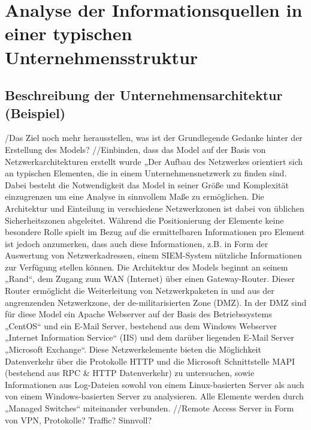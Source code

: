 \chapter{Analyse der Informationsquellen in einer typischen Unternehmensstruktur}
\label{cha:Analyse der Informationsquellen in einer typischen Unternehmensstruktur}


\section{Beschreibung der Unternehmensarchitektur (Beispiel)}




/Das Ziel noch mehr herausstellen, was ist der Grundlegende Gedanke hinter der Erstellung des Models? 
//Einbinden, dass das Model auf der Basis von Netzwerkarchitekturen erstellt wurde
„Der Aufbau des Netzwerkes orientiert sich an typischen Elementen, die in einem Unternehmensnetzwerk zu finden sind. Dabei besteht die Notwendigkeit das Model in seiner Größe und Komplexität einzugrenzen um eine Analyse in sinnvollem Maße zu ermöglichen. Die Architektur und Einteilung in verschiedene Netzwerkzonen ist dabei von üblichen Sicherheitszonen abgeleitet. Während die Positionierung der Elemente keine besondere Rolle spielt im Bezug auf die ermittelbaren Informationen pro Element ist jedoch anzumerken, dass auch diese Informationen, z.B. in Form der Auswertung von Netzwerkadressen, einem SIEM-System nützliche Informationen zur Verfügung stellen können. Die Architektur des Models beginnt an seinem „Rand“, dem Zugang zum WAN (Internet) über einen Gateway-Router. Dieser Router ermöglicht die Weiterleitung von Netzwerkpaketen in und aus der angrenzenden Netzwerkzone, der de-militarisierten Zone (DMZ). In der DMZ sind für diese Model ein Apache Webserver auf der Basis des Betriebssystems „CentOS“ und ein E-Mail Server, bestehend aus dem Windows Webserver „Internet Information Service“ (IIS) und dem darüber liegenden E-Mail Server „Microsoft Exchange“. Diese Netzwerkelemente bieten die Möglichkeit Datenverkehr über die Protokolle HTTP und die Microsoft Schnittstelle MAPI (bestehend aus RPC & HTTP Datenverkehr) zu untersuchen, sowie Informationen aus Log-Dateien sowohl von einem Linux-basierten Server als auch von einem Windows-basierten Server zu analysieren. Alle Elemente werden durch „Managed Switches“ miteinander verbunden.
//Remote Access Server in Form von VPN, Protokolle? Traffic? Sinnvoll?


